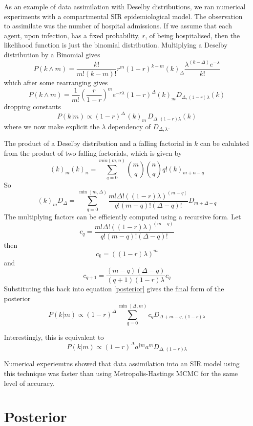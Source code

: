 \documentclass[letterpaper,twocolumn,10pt]{article}
\begin{document}
As an example of data assimilation with Deselby distributions, we ran numerical experiments with a compartmental SIR epidemiological model. The observation to assimilate was the number of hospital admissions. If we assume that each agent, upon infection, has a fixed probability, $r$, of being hospitalised, then the likelihood function is just the binomial distribution. Multiplying a Deselby distribution by a Binomial gives
\[
P(k \wedge m) = \frac{k!}{m!(k-m)!}r^m(1-r)^{k-m} (k)_\Delta \frac{\lambda^{(k-\Delta)}e^{-\lambda}}{k!}
\]
which after some rearranging gives
\[
P(k \wedge m) = \frac{1}{m!}\left(\frac{r}{1-r}\right)^m e^{-r\lambda} (1-r)^\Delta (k)_m D_{\Delta,(1-r)\lambda}(k)
\]
dropping constants
\begin{equation}
P(k|m) \propto (1-r)^\Delta \, (k)_m \,D_{\Delta,(1-r)\lambda}(k)
\label{posterior}
\end{equation}
where we now make explicit the $\lambda$ dependency of $D_{\Delta,\lambda}$.

The product of a Deselby distribution and a falling factorial in $k$ can be calulated from the product of two falling factorials, which is given by
\[
(k)_m(k)_n = \sum_{q=0}^{min(m,n)} {m \choose q}{n \choose q}q!(k)_{m+n-q}
\]
So
\[
(k)_m D_\Delta = \sum_{q=0}^{\min(m,\Delta)} \frac{m!\Delta!\left((1-r)\lambda\right)^{(m-q)}}{q!(m-q)!(\Delta-q)!} D_{m+\Delta-q}
\]
The multiplying factors can be efficiently computed using a recursive form. Let
\[
c_q = \frac{m!\Delta!\left((1-r)\lambda\right)^{(m-q)}}{q!(m-q)!(\Delta-q)!}
\]
then
\[
c_0 = ((1-r)\lambda)^m
\]
and
\[
c_{q+1} = \frac{(m-q)(\Delta - q)}{(q+1)(1-r)\lambda} c_q
\]
Substituting this back into equation \ref{posterior} gives the final form of the posterior
\begin{equation}
P(k|m) \propto (1-r)^\Delta \sum_{q=0}^{\min(\Delta,m)} c_q D_{\Delta+m-q,(1-r)\lambda}
\end{equation}

Interestingly, this is equivalent to
\begin{equation}
P(k|m) \propto (1-r)^\Delta a^{\dag m}a^m D_{\Delta,(1-r)\lambda}
\end{equation}


Numerical experiemtns showed that data assimilation into an SIR model using this technique was faster than using Metropolis-Hastings MCMC for the same level of accuracy.

\section{Posterior}
\end{document}

